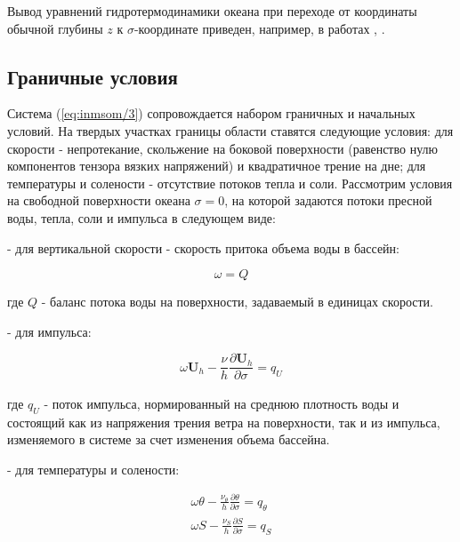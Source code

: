 	Вывод уравнений гидротермодинамики океана при переходе от координаты обычной глубины $z$ к $\sigma$-координате приведен, например,
	в работах \cite{AleskeevZalesny}, \cite{BlumbergMellor}.
	
	\subsection{Граничные условия}

    Система (\ref{eq:inmsom/3}) сопровождается набором граничных и начальных условий.
	На твердых участках границы области ставятся следующие условия: для скорости - непротекание, скольжение на боковой поверхности (равенство нулю компонентов тензора вязких напряжений) и квадратичное трение на дне; для температуры и солености - отсутствие потоков тепла и соли. 
	Рассмотрим условия на свободной поверхности океана $\sigma = 0 $, на которой задаются
	потоки пресной воды, тепла, соли и импульса в следующем виде:

	\bigskip
	- для вертикальной скорости - скорость притока объема воды в бассейн:

	\begin{equation} \label{eq:inmsom/bc1} 
	\displaystyle{ \omega =Q }
	\end{equation} 

	где $Q$ - баланс потока воды на поверхности, задаваемый в единицах скорости.

	\bigskip
	- для импульса:

	\begin{equation} \label{eq:inmsom/bc2} 
	\displaystyle{ \omega \textbf{U}_{h} -\frac{\nu }{h} \frac{\partial \textbf{U}_{h} }{\partial \sigma _{} } =q_{U} } 
	\end{equation} 

	где $q_U$ - поток импульса, нормированный на среднюю плотность воды и состоящий как из напряжения трения ветра на поверхности, так и из импульса, изменяемого в системе за счет изменения объема бассейна.

	\bigskip
	- для температуры и солености:

	\begin{equation} \label{eq:inmsom/bc3} 
	\begin{array}{l} 
	\displaystyle{ {\omega \theta -\frac{\nu _{\theta } }{h_{} } \frac{\partial \theta }{\partial \sigma } =q_{\theta } } } \\ 
	\displaystyle{ {\omega S-\frac{\nu _{S} }{h_{} } \frac{\partial S}{\partial \sigma } =q_{S} } } 
	\end{array} 
	\end{equation} 

